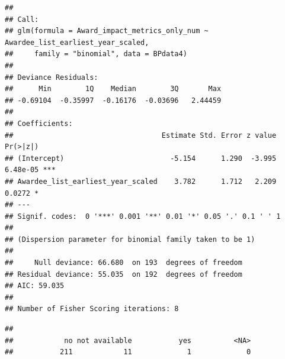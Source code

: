 \documentclass[
]{article}
\newenvironment{Shaded}{\begin{snugshade}}{\end{snugshade}}
\newcommand{\AttributeTok}[1]{\textcolor[rgb]{0.77,0.63,0.00}{#1}}
\newcommand{\CommentTok}[1]{\textcolor[rgb]{0.56,0.35,0.01}{\textit{#1}}}
\newcommand{\DocumentationTok}[1]{\textcolor[rgb]{0.56,0.35,0.01}{\textbf{\textit{#1}}}}
\newcommand{\FunctionTok}[1]{\textcolor[rgb]{0.00,0.00,0.00}{#1}}
\newcommand{\NormalTok}[1]{#1}
\newcommand{\SpecialCharTok}[1]{\textcolor[rgb]{0.00,0.00,0.00}{#1}}
\newcommand{\StringTok}[1]{\textcolor[rgb]{0.31,0.60,0.02}{#1}}
\begin{document}
\begin{verbatim}
## 
## Call:
## glm(formula = Award_impact_metrics_only_num ~ Awardee_list_earliest_year_scaled, 
##     family = "binomial", data = BPdata4)
## 
## Deviance Residuals: 
##      Min        1Q    Median        3Q       Max  
## -0.69104  -0.35997  -0.16176  -0.03696   2.44459  
## 
## Coefficients:
##                                   Estimate Std. Error z value Pr(>|z|)    
## (Intercept)                         -5.154      1.290  -3.995 6.48e-05 ***
## Awardee_list_earliest_year_scaled    3.782      1.712   2.209   0.0272 *  
## ---
## Signif. codes:  0 '***' 0.001 '**' 0.01 '*' 0.05 '.' 0.1 ' ' 1
## 
## (Dispersion parameter for binomial family taken to be 1)
## 
##     Null deviance: 66.680  on 193  degrees of freedom
## Residual deviance: 55.035  on 192  degrees of freedom
## AIC: 59.035
## 
## Number of Fisher Scoring iterations: 8
\end{verbatim}

\begin{Shaded}
\end{Shaded}

\begin{verbatim}
## 
##            no not available           yes          <NA> 
##           211            11             1             0
\end{verbatim}
\end{document}
